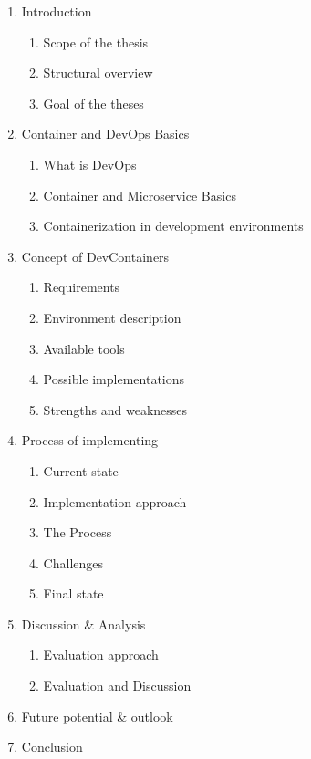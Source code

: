 \documentclass[12pt, a4paper]{article}
\begin{document}
\begin{enumerate}
    \item Introduction
    \begin{enumerate}
        \item Scope of the thesis
        \item Structural overview
        \item Goal of the theses
    \end{enumerate}
    \item Container and DevOps Basics
    \begin{enumerate}
        \item What is DevOps
        \item Container and Microservice Basics
        \item Containerization in development environments
    \end{enumerate}
    \item Concept of DevContainers
    \begin{enumerate}
        \item Requirements
        \item Environment description
        \item Available tools
        \item Possible implementations
        \item Strengths and weaknesses
    \end{enumerate}
    \item Process of implementing
    \begin{enumerate}
        \item Current state
        \item Implementation approach
        \item The Process
        \item Challenges
        \item Final state
    \end{enumerate}
    \item Discussion \& Analysis
    \begin{enumerate}
        \item Evaluation approach
        \item Evaluation and Discussion
    \end{enumerate}
    \item Future potential \& outlook
    \item Conclusion
\end{enumerate}
\end{document}

